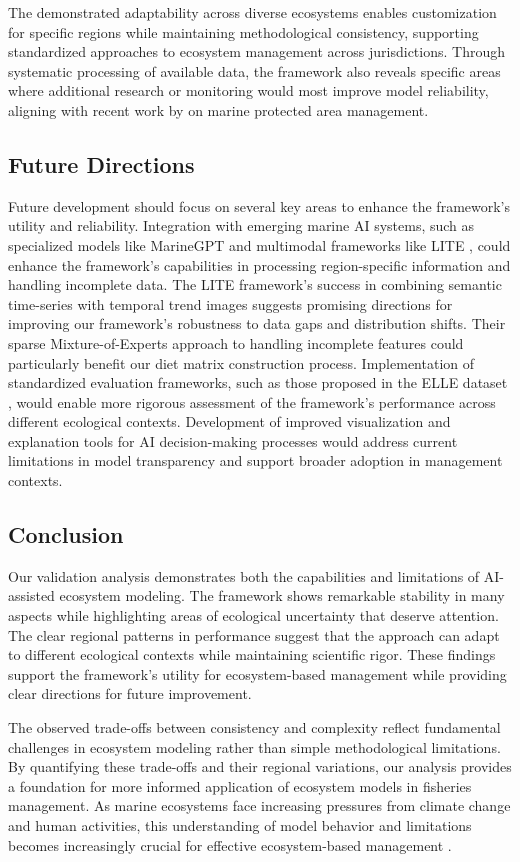 The demonstrated adaptability across diverse ecosystems enables customization for specific regions while maintaining methodological consistency, supporting standardized approaches to ecosystem management across jurisdictions. Through systematic processing of available data, the framework also reveals specific areas where additional research or monitoring would most improve model reliability, aligning with recent work by \cite{Chen2024} on marine protected area management.

\subsection{Future Directions}

Future development should focus on several key areas to enhance the framework's utility and reliability. Integration with emerging marine AI systems, such as specialized models like MarineGPT \citep{Zheng2023} and multimodal frameworks like LITE \citep{Li2024}, could enhance the framework's capabilities in processing region-specific information and handling incomplete data. The LITE framework's success in combining semantic time-series with temporal trend images suggests promising directions for improving our framework's robustness to data gaps and distribution shifts. Their sparse Mixture-of-Experts approach to handling incomplete features could particularly benefit our diet matrix construction process. Implementation of standardized evaluation frameworks, such as those proposed in the ELLE dataset \citep{Guo2025}, would enable more rigorous assessment of the framework's performance across different ecological contexts. Development of improved visualization and explanation tools for AI decision-making processes would address current limitations in model transparency and support broader adoption in management contexts.

\subsection{Conclusion}

Our validation analysis demonstrates both the capabilities and limitations of AI-assisted ecosystem modeling. The framework shows remarkable stability in many aspects while highlighting areas of ecological uncertainty that deserve attention. The clear regional patterns in performance suggest that the approach can adapt to different ecological contexts while maintaining scientific rigor. These findings support the framework's utility for ecosystem-based management while providing clear directions for future improvement.

The observed trade-offs between consistency and complexity reflect fundamental challenges in ecosystem modeling rather than simple methodological limitations. By quantifying these trade-offs and their regional variations, our analysis provides a foundation for more informed application of ecosystem models in fisheries management. As marine ecosystems face increasing pressures from climate change and human activities, this understanding of model behavior and limitations becomes increasingly crucial for effective ecosystem-based management \citep{Geary2020}.
